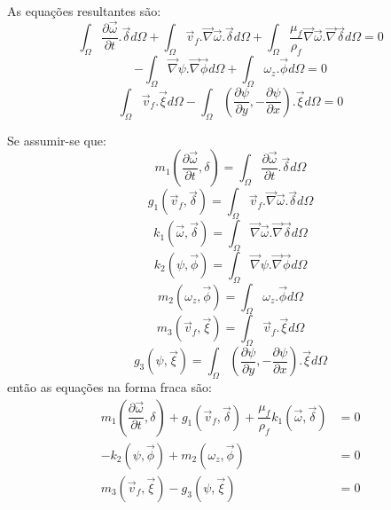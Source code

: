 As equações resultantes são:
\begin{equation}
    \int_{\Omega}
    \dfrac{\partial \vec{\omega}}{\partial t}
    .\vec{\delta} d\Omega +
    \int_{\Omega}
    \vec{v}_f.\vec{\nabla}\vec{\omega}
    .\vec{\delta} d\Omega +
    \int_{\Omega}
    \dfrac{\mu_f}{\rho_f}
    \vec{\nabla}\vec{\omega}.\vec{\nabla}
    \vec{\delta} d\Omega= 0
\end{equation}
\begin{equation}
    -\int_{\Omega}
    \vec{\nabla}\psi.\vec{\nabla}
    \vec{\phi} d\Omega +
    \int_{\Omega}
    \omega_z
    .\vec{\phi} d\Omega = 0
\end{equation}
\begin{equation}
    \int_{\Omega}
    \vec{v}_f
    .\vec{\xi} d\Omega -
    \int_{\Omega}
    \left(\dfrac{\partial \psi}{\partial y},
    -\dfrac{\partial \psi}{\partial x} \right)
    .\vec{\xi} d\Omega = 0
\end{equation}

Se assumir-se que:
\begin{equation}
    m_1 \left(\dfrac{\partial \vec{\omega}}{\partial t}, \delta\right) =
    \int_{\Omega}
    \dfrac{\partial \vec{\omega}}{\partial t}
    .\vec{\delta} d\Omega
\end{equation}
\begin{equation}
    g_1 (\vec{v}_f, \vec{\delta}) =
    \int_{\Omega}
    \vec{v}_f.\vec{\nabla}\vec{\omega}
    .\vec{\delta} d\Omega
\end{equation}
\begin{equation}
    k_1 (\vec{\omega}, \vec{\delta}) =
    \int_{\Omega}
    \vec{\nabla}\vec{\omega}.\vec{\nabla}
    \vec{\delta} d\Omega
\end{equation}
\begin{equation}
    k_2 (\psi, \vec{\phi}) =
    \int_{\Omega}
    \vec{\nabla}\psi.\vec{\nabla}
    \vec{\phi} d\Omega
\end{equation}
\begin{equation}
    m_2 (\omega_z, \vec{\phi}) =
    \int_{\Omega}
    \omega_z
    .\vec{\phi} d\Omega
\end{equation}
\begin{equation}
    m_3 (\vec{v}_f, \vec{\xi}) =
    \int_{\Omega}
    \vec{v}_f
    .\vec{\xi} d\Omega
\end{equation}
\begin{equation}
    g_3 (\psi, \vec{\xi}) =
    \int_{\Omega}
    \left(\dfrac{\partial \psi}{\partial y},
    -\dfrac{\partial \psi}{\partial x} \right)
    .\vec{\xi} d\Omega
\end{equation}
então as equações na forma fraca são:
\begin{align}
    m_1 \left(\dfrac{\partial \vec{\omega}}{\partial t}, \delta\right) +
    g_1 (\vec{v}_f, \vec{\delta}) + 
    \dfrac{\mu_f}{\rho_f} k_1 (\vec{\omega}, \vec{\delta}) &=0\\
    -k_2 (\psi, \vec{\phi}) +
    m_2 (\omega_z, \vec{\phi}) &= 0 \\
    m_3 (\vec{v}_f, \vec{\xi}) - 
    g_3 (\psi, \vec{\xi}) &=0
\end{align}

